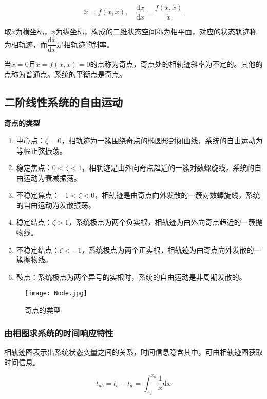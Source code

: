 \documentclass[cn, blue, normal, 12pt]{elegantnote}
\begin{document}
\begin{equation}
    \ddot{x}=f(x,\dot{x}), \quad \frac{\mathrm{d}\dot{x}}{{\mathrm{d}x}}=\frac{f(x,\dot{x})}{\dot{x}}
\end{equation}

取$x$为横坐标，$\dot{x}$为纵坐标，构成的二维状态空间称为相平面，对应的状态轨迹称为相轨迹，而$\dfrac{\mathrm{d}\dot{x}}{\mathrm{d}x}$是相轨迹的斜率。

当$\dot{x}=0$且$\ddot{x}=f(x,\dot{x})=0$的点称为奇点，奇点处的相轨迹斜率为不定的。其他的点称为普通点。系统的平衡点是奇点。

\subsection{二阶线性系统的自由运动}

\textbf{奇点的类型}

\begin{enumerate}
    \setlength{\itemsep}{6pt}
    \item 中心点：$\zeta=0$，相轨迹为一簇围绕奇点的椭圆形封闭曲线，系统的自由运动为等幅正弦振荡。
    \item 稳定焦点：$0<\zeta<1$，相轨迹是由外向奇点趋近的一簇对数螺旋线，系统的自由运动为衰减振荡。
    \item 不稳定焦点：$-1<\zeta<0$，相轨迹是由奇点向外发散的一簇对数螺旋线，系统的自由运动为发散振荡。
    \item 稳定结点：$\zeta>1$，系统极点为两个负实根，相轨迹为由外向奇点趋近的一簇抛物线。
    \item 不稳定结点：$\zeta<-1$，系统极点为两个正实根，相轨迹为由奇点向外发散的一簇抛物线。
    \item 鞍点：系统极点为两个异号的实根时，系统的自由运动是非周期发散的。
\end{enumerate}

\begin{figure}[htbp]
    \centering
    \texttt{[image: Node.jpg]}
    \caption{奇点的类型}
\end{figure}

\subsubsection{由相图求系统的时间响应特性}

相轨迹图表示出系统状态变量之间的关系，时间信息隐含其中，可由相轨迹图获取时间信息。

\begin{equation}
    t_{ab}=t_b-t_a=\int_{x_a}^{x_b}\frac{1}{\dot{x}}\mathrm{d}x
\end{equation}
\end{document}
